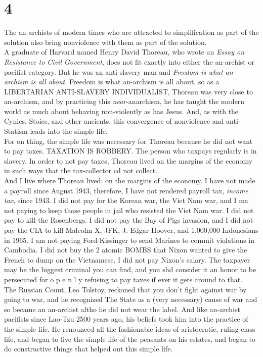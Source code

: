 \documentclass[12pt, onecolumn, letterpaper, oneside]{book}
\begin{document}
\section*{4}
The an-archists of modern times who are attracted to simplification as part of the solution also bring nonviolence with them as part of the solution.\\
A graduate of Harvard named Henry David Thoreau, who wrote an \emph{Essay on Resistance to Civil Government}, does not fit exactly into either the an-archist or pacifist category. But he was an anti-slavery man and \emph{Freedom is what an-archism is all about.} Freedom is what an-archism is all about, so as a LIBERTARIAN ANTI-SLAVERY INDIVIDUALIST, Thoreau was very close to an-archism, and by practicing this \emph{near}-anarchism, he has taught the modern world as much about behaving non-violently as has Jesus. And, as with the Cynics, Stoics, and other ancients, this convergence of nonviolence and anti-Statism leads into the simple life.\\
For on thing, the simple life was necessary for Thoreau because he did not want to pay taxes. TAXATION IS ROBBERY. The person who taxpays regularly is in slavery. In order to not pay taxes, Thoreau lived on the margins of the economy in such ways that the tax-collector cd not collect.\\
And I live where Thoreau lived: on the margins of the economy. I have not made a payroll since August 1943, therefore, I have not rendered payroll tax, \emph{income tax}, since 1943. I did not pay for the Korean war, the Viet Nam war, and I ma not paying to keep those people in jail who resisted the Viet Nam war. I did not pay to kill the Rosenbergs. I did not pay the Bay of Pigs invasion, and I did not pay the CIA to kill Malcolm X, JFK, J. Edgar Hoover, and 1,000,000 Indonesians in 1965. I am not paying Ford-Kissinger to send Marines to commit violations in Cambodia. I did not buy the 2 atomic BOMBS that Nixon wanted to give the French to dump on the Vietnamese. I did not pay Nixon's salary. The taxpayer may be the biggest criminal you can find, and you shd consider it an honor to be persecuted for o p e n l y refusing to pay taxes if ever it gets around to that.\\
The Russian Count, Leo Tolstoy, reckoned that you don't fight against war by going to war, and he recognized The State as a (very necessary) cause of war and so became an an-archist altho he did not wear the label. And like an-archist pacifists since Lao-Tzu 2500 years ago, his beliefs took him into the practice of the simple life. He renounced all the fashionable ideas of aristocratic, ruling class life, and began to live the simple life of the peasants on his estates, and began to do constructive things that helped out this simple life.\\
\end{document}
